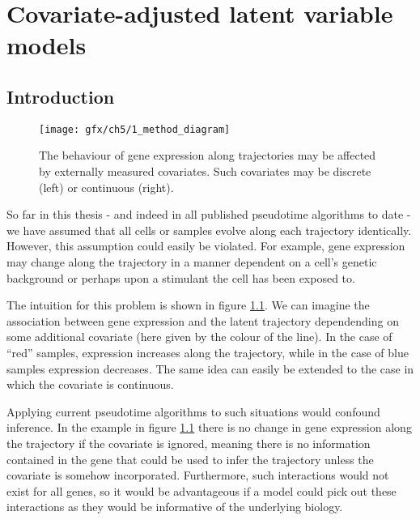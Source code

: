 \chapter{Covariate-adjusted latent variable models}\label{ch:phenotimechap} %



\section{Introduction}

\begin{figure}
\centering
  \texttt{[image: gfx/ch5/1\_method\_diagram]}
  \caption{The behaviour of gene expression along trajectories may be affected by externally measured covariates.
  Such covariates may be discrete (left) or continuous (right).
  } \label{fig:phenotime_diagram}
\end{figure}

So far in this thesis - and indeed in all published pseudotime algorithms to date - we have assumed that all cells or samples evolve along each trajectory identically. However, this assumption could easily be violated. For example, gene expression may change along the trajectory in a manner dependent on a cell's genetic background or perhaps upon a stimulant the cell has been exposed to.

The intuition for this problem is shown in figure \ref{fig:phenotime_diagram}. We can imagine the association between gene expression and the latent trajectory dependending on some additional covariate (here given by the colour of the line). In the case of ``red'' samples, expression increases along the trajectory, while in the case of blue samples expression decreases. The same idea can easily be extended to the case in which the covariate is continuous.

Applying current pseudotime algorithms to such situations would confound inference. In the example in figure \ref{fig:phenotime_diagram} there is no change in gene expression along the trajectory if the covariate is ignored, meaning there is no information contained in the gene that could be used to infer the trajectory unless the covariate is somehow incorporated. Furthermore, such interactions would not exist for all genes, so it would be advantageous if a model could pick out these interactions as they would be informative of the underlying biology.

